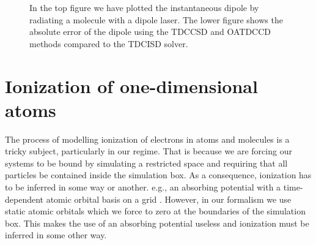 \begin{figure}
            \caption{In the top figure we have plotted the instantaneous
            dipole by radiating a  molecule with a dipole laser.
            The lower figure shows the absolute error of the dipole using
            the TDCCSD and OATDCCD methods compared to the TDCISD solver.}
            \label{fig:dipole-moment-li}
        \end{figure}

    \section{Ionization of one-dimensional atoms}
        The process of modelling ionization of electrons in atoms and
        molecules is a tricky subject, particularly in our regime.
        That is because we are forcing our systems to be bound by simulating a
        restricted space and requiring that all particles be contained inside
        the simulation box.
        As a consequence, ionization has to be inferred in some way or another.
        e.g., an absorbing potential with a time-dependent atomic orbital basis
        on a grid \cite{kosloff1986363, miyagi_and_madsen, takeshi}.
        However, in our formalism we use static atomic orbitals which we
        force to zero at the boundaries of the simulation box.
        This makes the use of an absorbing potential useless and ionization
        must be inferred in some other way.

